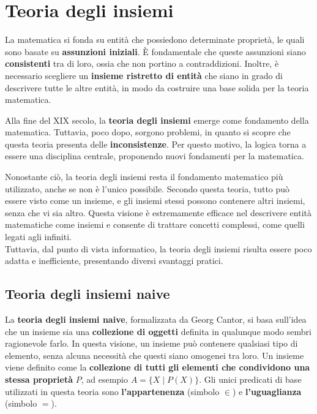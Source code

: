 \documentclass[
  a4paper,
]{article}
\begin{document}
\newpage

\hypertarget{teoria-degli-insiemi}{%
\section{Teoria degli insiemi}\label{teoria-degli-insiemi}}

La matematica si fonda su entità che possiedono determinate proprietà,
le quali sono basate su \textbf{assunzioni iniziali}. È fondamentale che
queste assunzioni siano \textbf{consistenti} tra di loro, ossia che non
portino a contraddizioni. Inoltre, è necessario scegliere un
\textbf{insieme ristretto di entità} che siano in grado di descrivere
tutte le altre entità, in modo da costruire una base solida per la
teoria matematica.

Alla fine del XIX secolo, la \textbf{teoria degli insiemi} emerge come
fondamento della matematica. Tuttavia, poco dopo, sorgono problemi, in
quanto si scopre che questa teoria presenta delle
\textbf{inconsistenze}. Per questo motivo, la logica torna a essere una
disciplina centrale, proponendo nuovi fondamenti per la matematica.

Nonostante ciò, la teoria degli insiemi resta il fondamento matematico
più utilizzato, anche se non è l'unico possibile. Secondo questa teoria,
tutto può essere visto come un insieme, e gli insiemi stessi possono
contenere altri insiemi, senza che vi sia altro. Questa visione è
estremamente efficace nel descrivere entità matematiche come insiemi e
consente di trattare concetti complessi, come quelli legati agli
infiniti.\\
Tuttavia, dal punto di vista informatico, la teoria degli insiemi
risulta essere poco adatta e inefficiente, presentando diversi svantaggi
pratici.

\hypertarget{teoria-degli-insiemi-naive}{%
\subsection{Teoria degli insiemi
naive}\label{teoria-degli-insiemi-naive}}

La \textbf{teoria degli insiemi naive}, formalizzata da Georg Cantor, si
basa sull'idea che un insieme sia una \textbf{collezione di oggetti}
definita in qualunque modo sembri ragionevole farlo. In questa visione,
un insieme può contenere qualsiasi tipo di elemento, senza alcuna
necessità che questi siano omogenei tra loro. Un insieme viene definito
come la \textbf{collezione di tutti gli elementi che condividono una
stessa proprietà} \(P\), ad esempio \(A = \{ X \mid P(X) \}\). Gli unici
predicati di base utilizzati in questa teoria sono
\textbf{l'appartenenza} (simbolo \(\in\)) e \textbf{l'uguaglianza}
(simbolo \(=\)).
\end{document}
